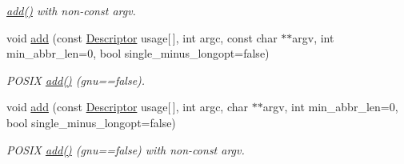 \begin{DoxyCompactItemize}
\begin{DoxyCompactList}\small\item\em \hyperlink{structxmem_1_1config_1_1third__party_1_1_stats_a067da76c0d531c9cceb5fd1c3b8c6a2b}{add()} with non-\/const argv. \end{DoxyCompactList}\item 
\hypertarget{structxmem_1_1config_1_1third__party_1_1_stats_aa19ac2a7dda954c719d4de88b8bebe61}{void \hyperlink{structxmem_1_1config_1_1third__party_1_1_stats_aa19ac2a7dda954c719d4de88b8bebe61}{add} (const \hyperlink{structxmem_1_1config_1_1third__party_1_1_descriptor}{Descriptor} usage\mbox{[}$\,$\mbox{]}, int argc, const char $\ast$$\ast$argv, int min\-\_\-abbr\-\_\-len=0, bool single\-\_\-minus\-\_\-longopt=false)}\label{structxmem_1_1config_1_1third__party_1_1_stats_aa19ac2a7dda954c719d4de88b8bebe61}

\begin{DoxyCompactList}\small\item\em P\-O\-S\-I\-X \hyperlink{structxmem_1_1config_1_1third__party_1_1_stats_a067da76c0d531c9cceb5fd1c3b8c6a2b}{add()} (gnu==false). \end{DoxyCompactList}\item 
\hypertarget{structxmem_1_1config_1_1third__party_1_1_stats_a9168980abd6cfd4c2f6fd9d8dbfa9910}{void \hyperlink{structxmem_1_1config_1_1third__party_1_1_stats_a9168980abd6cfd4c2f6fd9d8dbfa9910}{add} (const \hyperlink{structxmem_1_1config_1_1third__party_1_1_descriptor}{Descriptor} usage\mbox{[}$\,$\mbox{]}, int argc, char $\ast$$\ast$argv, int min\-\_\-abbr\-\_\-len=0, bool single\-\_\-minus\-\_\-longopt=false)}\label{structxmem_1_1config_1_1third__party_1_1_stats_a9168980abd6cfd4c2f6fd9d8dbfa9910}

\begin{DoxyCompactList}\small\item\em P\-O\-S\-I\-X \hyperlink{structxmem_1_1config_1_1third__party_1_1_stats_a067da76c0d531c9cceb5fd1c3b8c6a2b}{add()} (gnu==false) with non-\/const argv. \end{DoxyCompactList}\end{DoxyCompactItemize}
